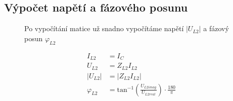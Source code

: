 \subsection{Výpočet napětí a fázového posunu}
\begin{figure}[H]
  Po vypočítání matice už snadno vypočítáme napětí $|U_{L2}|$ a fázový posun $\varphi_{L2}$

  \begin{equation*}
    \begin{aligned}
      I_{L2}       & = I_C                                                                               \\
      U_{L2}       & = Z_{L2} I_{L2}                                                                     \\
      |U_{L2}|     & = |Z_{L2} I_{L2}|                                                                   \\
      \varphi_{L2} & = \mathrm{tan^{-1}}\left(\frac{U_{L2imag}}{U_{L2real}}\right) \cdot \frac{180}{\pi}
    \end{aligned}
  \end{equation*}
\end{figure}

